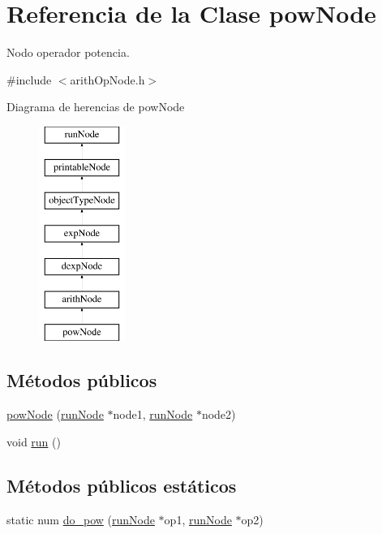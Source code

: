 \hypertarget{classpowNode}{\section{Referencia de la Clase pow\-Node}
\label{classpowNode}
}


Nodo operador potencia.  




{\ttfamily \#include $<$arith\-Op\-Node.\-h$>$}

Diagrama de herencias de pow\-Node\begin{figure}[H]
\begin{center}
\leavevmode
\includegraphics[height=7.000000cm]{classpowNode}
\end{center}
\end{figure}
\subsection*{Métodos públicos}
\begin{DoxyCompactItemize}
\item 
\hyperlink{classpowNode_a9f4c90105fa4281bc474ad55a6b02235}{pow\-Node} (\hyperlink{classrunNode}{run\-Node} $\ast$node1, \hyperlink{classrunNode}{run\-Node} $\ast$node2)
\item 
void \hyperlink{classpowNode_addee6366a08fc6dc4fed08f04b48e3ef}{run} ()
\end{DoxyCompactItemize}
\subsection*{Métodos públicos estáticos}
\begin{DoxyCompactItemize}
\item 
static num \hyperlink{classpowNode_acae3871f4333db8866441a8117f35cd7}{do\-\_\-pow} (\hyperlink{classrunNode}{run\-Node} $\ast$op1, \hyperlink{classrunNode}{run\-Node} $\ast$op2)
\end{DoxyCompactItemize}
